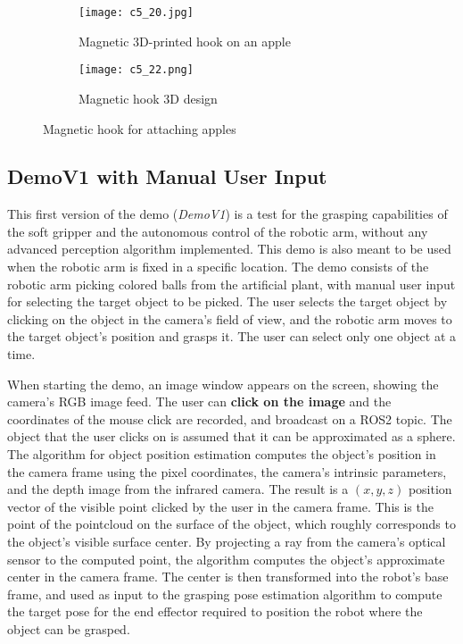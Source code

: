 \begin{figure}[ht]
    \centering
    \begin{subfigure}{0.55\textwidth}
        \texttt{[image: c5\_20.jpg]}
        \caption{Magnetic 3D-printed hook on an apple}
        \label{fig:hook3dprint}
    \end{subfigure}
    \hfill %
    \begin{subfigure}{0.4\textwidth}
        \texttt{[image: c5\_22.png]}
        \caption{Magnetic hook 3D design}
        \label{fig:hookdesign}
    \end{subfigure}
    \caption{Magnetic hook for attaching apples}
    \label{fig:hook}
\end{figure}

\subsection{DemoV1 with Manual User Input}

This first version of the demo (\textit{DemoV1}) is a test for the grasping capabilities of the soft gripper and
the autonomous control of the robotic arm, without any advanced perception algorithm implemented. 
This demo is also meant to be used when the robotic arm is fixed in a specific location. The demo consists of
the robotic arm picking colored balls from the artificial plant, with manual user input for selecting the target
object to be picked. The user selects the target object by clicking on the object in the camera's field of view,
and the robotic arm moves to the target object's position and grasps it. The user can select only one object at 
a time.

When starting the demo, an image window appears on the screen, showing the camera's RGB image feed.
The user can \textbf{click on the image} and the coordinates of the mouse click are recorded, and broadcast on a ROS2
topic. The object that the user clicks on is assumed that it can be approximated as a sphere.
The algorithm for object position estimation computes the object's position in the camera frame
using the pixel coordinates, the camera's intrinsic parameters, and the depth image from the infrared camera.
The result is a $(x, y, z)$ position vector of the visible point clicked by the user in the camera frame. 
This is the point of the pointcloud on the surface of the object, which roughly corresponds to the 
object's visible surface center. By projecting a ray from the camera's optical sensor to the computed point,
the algorithm computes the object's approximate center in the camera frame. The center is then transformed
into the robot's base frame, and used as input to the grasping pose estimation algorithm to compute the target pose
for the end effector required to position the robot where the object can be grasped.

